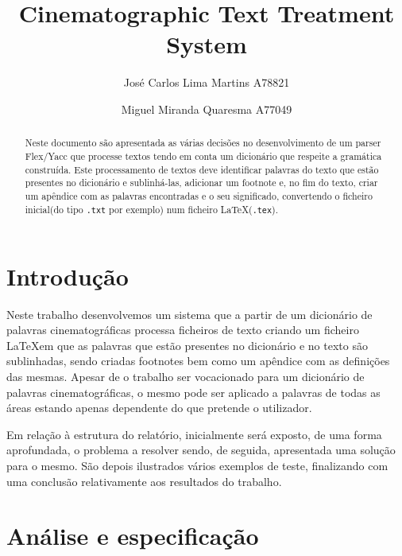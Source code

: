 \documentclass{llncs}
\begin{document}
 \mainmatter
\title{Cinematographic Text Treatment System}
\author{José Carlos Lima Martins A78821 \and
        Miguel Miranda Quaresma A77049}

\maketitle

\justify

\begin{abstract}
    Neste documento são apresentada as várias decisões  no desenvolvimento de um parser Flex/Yacc que processe textos tendo em conta um dicionário que respeite a gramática construída. Este processamento de textos deve identificar palavras do texto que estão presentes no dicionário e sublinhá-las, adicionar um footnote e, no fim do texto, criar um apêndice com as palavras encontradas e o seu significado, convertendo o ficheiro inicial(do tipo \verb|.txt| por exemplo) num ficheiro \LaTeX(\verb|.tex|).
\end{abstract}

\section{Introdução}
Neste trabalho desenvolvemos um sistema que a partir de um dicionário de palavras cinematográficas processa ficheiros de texto criando um ficheiro \LaTeX em que as palavras que estão presentes no dicionário e no texto são sublinhadas, sendo criadas footnotes bem como um apêndice com as definições das mesmas. Apesar de o trabalho ser vocacionado para um dicionário de palavras cinematográficas, o mesmo pode ser aplicado a palavras de todas as áreas estando apenas dependente do que pretende o utilizador.

Em relação à estrutura do relatório, inicialmente será exposto, de uma forma aprofundada, o problema a resolver sendo, de seguida, apresentada uma solução para o mesmo. São depois ilustrados vários exemplos de teste, finalizando com uma conclusão relativamente aos resultados do trabalho.

\section{Análise e especificação}
\end{document}
